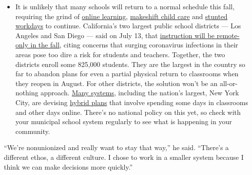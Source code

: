 \begin{itemize}
  \begin{itemize}
  \tightlist
  \item
    It is unlikely that many schools will return to a normal schedule
    this fall, requiring the grind of
    \href{https://www.nytimes.com/2020/06/05/us/coronavirus-education-lost-learning.html?action=click\&pgtype=Article\&state=default\&region=MAIN_CONTENT_3\&context=storylines_faq}{online
    learning},
    \href{https://www.nytimes.com/2020/05/29/us/coronavirus-child-care-centers.html?action=click\&pgtype=Article\&state=default\&region=MAIN_CONTENT_3\&context=storylines_faq}{makeshift
    child care} and
    \href{https://www.nytimes.com/2020/06/03/business/economy/coronavirus-working-women.html?action=click\&pgtype=Article\&state=default\&region=MAIN_CONTENT_3\&context=storylines_faq}{stunted
    workdays} to continue. California's two largest public school
    districts --- Los Angeles and San Diego --- said on July 13, that
    \href{https://www.nytimes.com/2020/07/13/us/lausd-san-diego-school-reopening.html?action=click\&pgtype=Article\&state=default\&region=MAIN_CONTENT_3\&context=storylines_faq}{instruction
    will be remote-only in the fall}, citing concerns that surging
    coronavirus infections in their areas pose too dire a risk for
    students and teachers. Together, the two districts enroll some
    825,000 students. They are the largest in the country so far to
    abandon plans for even a partial physical return to classrooms when
    they reopen in August. For other districts, the solution won't be an
    all-or-nothing approach.
    \href{https://bioethics.jhu.edu/research-and-outreach/projects/eschool-initiative/school-policy-tracker/}{Many
    systems}, including the nation's largest, New York City, are
    devising
    \href{https://www.nytimes.com/2020/06/26/us/coronavirus-schools-reopen-fall.html?action=click\&pgtype=Article\&state=default\&region=MAIN_CONTENT_3\&context=storylines_faq}{hybrid
    plans} that involve spending some days in classrooms and other days
    online. There's no national policy on this yet, so check with your
    municipal school system regularly to see what is happening in your
    community.
  \end{itemize}
\end{itemize}

``We're nonunionized and really want to stay that way,'' he said.
``There's a different ethos, a different culture. I chose to work in a
smaller system because I think we can make decisions more quickly.''

